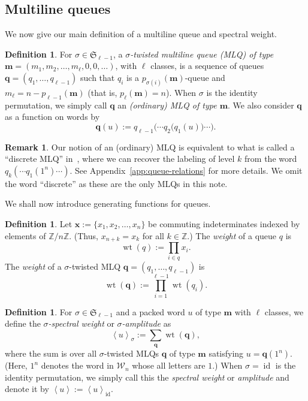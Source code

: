 \documentclass[reqno]{amsart}
\newcommand{\0}{\phantom{c}}
\newcommand{\swt}[1]{\left\langle #1 \right\rangle} %
\newcommand{\SymGp}[1]{\mathfrak{S}_{#1}} %
\DeclareMathOperator{\wt}{wt} %
\DeclareMathOperator{\id}{id} %
\newcommand{\mm}{\mathbf{m}}
\newcommand{\qq}{\mathbf{q}}
\newcommand{\xx}{\mathbf{x}}
\newcommand{\mcW}{\mathcal{W}}
\newcommand{\ZZ}{\mathbb{Z}}
\let\sumnonlimits\sum
\let\prodnonlimits\prod
\renewcommand{\sum}{\sumnonlimits\limits}
\renewcommand{\prod}{\prodnonlimits\limits}
\newcommand{\tup}[1]{\left( #1 \right)}
\newcommand{\defn}[1]{{\color{darkred}\emph{#1}}} %
\theoremstyle{plain}
\theoremstyle{definition}
\newtheorem{dfn}[thm]{Definition}
\newtheorem{remark}[thm]{Remark}
\numberwithin{equation}{section}
\begin{document}
\subsection{Multiline queues}

We now give our main definition of a multiline queue and spectral weight.

\begin{dfn}
For $\sigma \in \SymGp{\ell-1}$, a \defn{$\sigma$-twisted multiline queue (MLQ) of type $\mm = \tup{m_1, m_2, \ldots, m_\ell, 0, 0, \ldots}$}, with $\ell$ classes, is a sequence of queues $\qq = (q_1, \dotsc, q_{\ell-1})$ such that $q_i$ is a $p_{\sigma(i)}(\mm)$-queue and $m_{\ell} = n - p_{\ell-1}(\mm)$ (that is, $p_\ell(\mm) = n$).
When $\sigma$ is the identity permutation, we simply call $\qq$ an \defn{(ordinary) MLQ of type $\mm$}.
We also consider $\qq$ as a function on words by
\[
\qq(u) := q_{\ell-1}\bigl( \cdots q_2\bigl( q_1(u) \bigr) \cdots \bigr).
\]
\end{dfn}

\begin{remark}
Our notion of an (ordinary) MLQ is equivalent to what is called a ``discrete MLQ'' in~\cite[\S 2.2]{AasLin17}, where we can recover the labeling of level $k$ from the word $q_k( \cdots q_1(1^n) \cdots )$.
See Appendix~\ref{app:queue-relations} for more details.
We omit the word ``discrete'' as these are the only MLQs in this note.
\end{remark}

We shall now introduce generating functions for queues.

\begin{dfn}
Let $\xx := \{x_1, x_2, \ldots, x_n\}$ be commuting indeterminates indexed by elements of $\ZZ / n \ZZ$.
(Thus, $x_{n+k} = x_k$ for all $k \in \ZZ$.)
The \defn{weight} of a queue $q$ is
\[
  \wt(q) := \prod_{i \in q} x_i.
\]
The \defn{weight} of a $\sigma$-twisted MLQ $\qq = (q_1, \dotsc, q_{\ell-1})$ is
\[
  \wt(\qq) := \prod_{i=1}^{\ell-1} \wt(q_i).
\]
\end{dfn}

\begin{dfn}
For $\sigma \in \SymGp{\ell-1}$ and a packed word $u$ of type $\mm$ with $\ell$ classes, we define the \defn{$\sigma$-spectral weight} or \defn{$\sigma$-amplitude} as
\[
  \swt{u}_{\sigma} := \sum_{\qq} \wt(\qq),
\]
where the sum is over all $\sigma$-twisted MLQs $\qq$ of type $\mm$ satisfying $u = \qq(1^n)$.
(Here, $1^n$ denotes the word in $\mcW_n$ whose all letters are $1$.)
When $\sigma = \id$ is the identity permutation, we simply call this the \defn{spectral weight} or \defn{amplitude} and denote it by $\swt{u} := \swt{u}_{\id}$.
\end{dfn}
\end{document}
